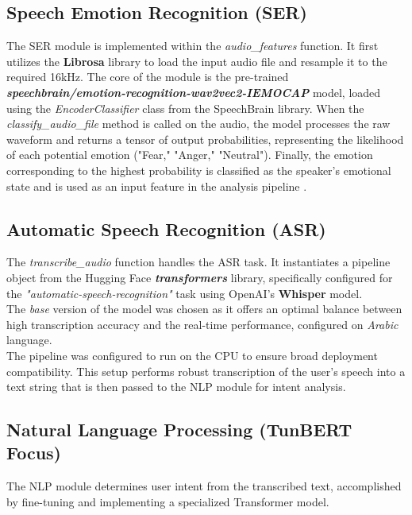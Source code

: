 \documentclass[12pt,a4paper,oneside,english]{book}
\begin{document}
\subsection{Speech Emotion Recognition (SER)}
\label{subsec:ser_implementation}
The SER module is implemented within the \textit{audio\_features} function. It first utilizes the \textbf{Librosa} library to load the input audio file and resample it to the required 16kHz. 
The core of the module is the pre-trained \textbf{\textit{speechbrain/emotion-recognition-wav2vec2-IEMOCAP}} model, loaded using the \textit{EncoderClassifier} class from the SpeechBrain library. 
 When the \textit{classify\_audio\_file} method is called on the audio, the model processes the raw waveform and returns a tensor of output probabilities, representing the likelihood of each potential emotion ("Fear," "Anger," "Neutral").
Finally, the emotion corresponding to the highest probability is classified as the speaker's emotional state and is used as an input feature in the analysis pipeline .

\subsection{Automatic Speech Recognition (ASR)}
\label{subsec:asr_implementation}
The \textit{transcribe\_audio} function handles the ASR task. It instantiates a pipeline object from the Hugging Face \textbf{\textit{transformers}} library, specifically configured for the \textit{"automatic-speech-recognition"} task using OpenAI's \textbf{Whisper} model.
\\The \textit{base} version of the model was chosen as it offers an optimal balance between high transcription accuracy and the real-time performance, configured on \textit{Arabic} language.
\\The pipeline was configured to run on the CPU to ensure broad deployment compatibility. 
This setup performs robust transcription of the user's speech into a text string that is then passed to the NLP module for intent analysis.

\subsection{Natural Language Processing (TunBERT Focus)}
\label{sec:nlp_tunbert_implementation}
The NLP module determines user intent from the transcribed text, accomplished by fine-tuning and implementing a specialized Transformer model.
\end{document}
